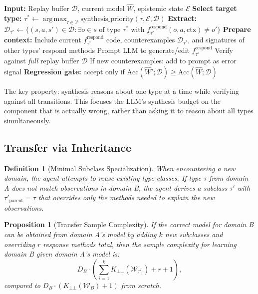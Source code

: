 \documentclass{article}
\newtheorem{definition}{Definition}
\newtheorem{proposition}{Proposition}
\DeclareMathOperator*{\argmax}{arg\,max}
\newcommand{\calD}{\mathcal{D}}
\newcommand{\calE}{\mathcal{E}}
\newcommand{\calV}{\mathcal{V}}
\newcommand{\calW}{\mathcal{W}}
\begin{document}
\begin{algorithm}[h]
\caption{Per-Type CEGIS Synthesis}
\label{alg:synthesis}
\begin{algorithmic}[1]
\STATE \textbf{Input:} Replay buffer $\calD$, current model $\hat{W}$,
       epistemic state $\calE$
\STATE \textbf{Select target type:} $\tau^* \leftarrow
       \argmax_{\tau \in \calV} \text{synthesis\_priority}(\tau, \calE, \calD)$
\STATE \textbf{Extract:} $\calD_{\tau^*} \leftarrow \{(s, a, s') \in \calD :
       \exists o \in s \text{ of type } \tau^* \text{ with }
       f_{\tau^*}^{\text{respond}}(o, a, \text{ctx}) \neq o'\}$
\STATE \textbf{Prepare context:} Include current $f_{\tau^*}^{\text{respond}}$
       code, counterexamples $\calD_{\tau^*}$, and signatures of other types'
       respond methods
\REPEAT
    \STATE Prompt LLM to generate/edit $f_{\tau^*}^{\text{respond}}$
    \STATE Verify against \emph{full} replay buffer $\calD$
    \STATE If new counterexamples: add to prompt as error signal
\STATE \textbf{Regression gate:} accept only if
       $\text{Acc}(\hat{W}'; \calD) \geq \text{Acc}(\hat{W}; \calD)$
\end{algorithmic}
\end{algorithm}

The key property: synthesis reasons about one type at a time while verifying
against all transitions.  This focuses the LLM's synthesis budget on the
component that is actually wrong, rather than asking it to reason about all
types simultaneously.

\subsection{Transfer via Inheritance}
\label{sec:transfer}

\begin{definition}[Minimal Subclass Specialization]
\label{def:transfer}
When encountering a new domain, the agent attempts to reuse existing type
classes.  If type $\tau$ from domain A does not match observations in domain B,
the agent derives a subclass $\tau'$ with $\tau'_{\text{parent}} = \tau$ that
overrides only the methods needed to explain the new observations.
\end{definition}

\begin{proposition}[Transfer Sample Complexity]
\label{prop:transfer}
If the correct model for domain B can be obtained from domain A's model by
adding $k$ new subclasses and overriding $r$ response methods total, then the
sample complexity for learning domain B given domain A's model is:
\begin{equation}
    D_{B} \cdot \left(\sum_{i=1}^{k}
        K_{\bot\!\!\bot}(\calW_{\tau'_i}) + r + 1\right),
\end{equation}
compared to $D_{B} \cdot (K_{\bot\!\!\bot}(\calW_{B}) + 1)$ from scratch.
\end{proposition}
\end{document}
